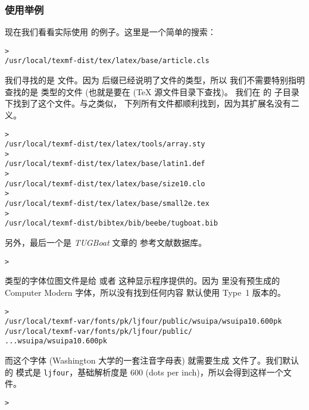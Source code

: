 \documentclass{article}
\begin{document}
\subsubsection{使用举例}
\label{sec:examples-of-use}

现在我们看看实际使用 \KPS{} 的例子。这里是一个简单的搜索：

\begin{alltt}
> 
   /usr/local/texmf-dist/tex/latex/base/article.cls
\end{alltt}
我们寻找的是  文件。因为  后缀已经说明了文件的类型，所以
我们不需要特别指明查找的是  类型的文件 (也就是要在 (\TeX{} 源文件目录下查找)。
我们在  的  子目录下找到了这个文件。与之类似，
下列所有文件都顺利找到，因为其扩展名没有二义。
\begin{alltt}
> 
   /usr/local/texmf-dist/tex/latex/tools/array.sty
> 
   /usr/local/texmf-dist/tex/latex/base/latin1.def
> 
   /usr/local/texmf-dist/tex/latex/base/size10.clo
> 
   /usr/local/texmf-dist/tex/latex/base/small2e.tex
> 
   /usr/local/texmf-dist/bibtex/bib/beebe/tugboat.bib
\end{alltt}

另外，最后一个是 \textsl{TUGBoat} 文章的 \BibTeX{} 参考文献数据库。

\begin{alltt}
> 
\end{alltt}

 类型的字体位图文件是给  或者 
这种显示程序提供的。因为 \TL{} 里没有预生成的 Computer Modern 
字体，所以没有找到任何内容\Dash \TL{} 默认使用 Type~1 版本的。

\begin{alltt}
> 
\ifSingleColumn   /usr/local/texmf-var/fonts/pk/ljfour/public/wsuipa/wsuipa10.600pk
\else /usr/local/texmf-var/fonts/pk/ljfour/public/
...                         wsuipa/wsuipa10.600pk
\fi\end{alltt}

而这个字体 (Washington 大学的一套注音字母表) 就需要生成  文件了。我们默认的
\MF{} 模式是 \texttt{ljfour}，基础解析度是 600\dpi{} (dots per inch)，所以会得到这样一个文件。
\begin{alltt}
> 
\end{alltt}
\end{document}
